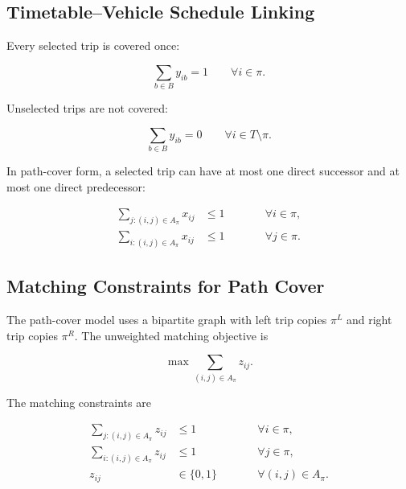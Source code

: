 \subsection{Timetable--Vehicle Schedule Linking}

Every selected trip is covered once:

\begin{equation}
\sum_{b\in B} y_{ib}=1
\qquad
\forall i\in \pi.
\label{eq:trip-covered-once}
\end{equation}

Unselected trips are not covered:

\begin{equation}
\sum_{b\in B} y_{ib}=0
\qquad
\forall i\in T\setminus \pi.
\label{eq:unselected-not-covered}
\end{equation}

In path-cover form, a selected trip can have at most one direct successor and
at most one direct predecessor:

\begin{align}
\sum_{j:(i,j)\in A_\pi} x_{ij} &\le 1
\qquad &&\forall i\in \pi, \label{eq:successor-limit}\\
\sum_{i:(i,j)\in A_\pi} x_{ij} &\le 1
\qquad &&\forall j\in \pi. \label{eq:predecessor-limit}
\end{align}

\subsection{Matching Constraints for Path Cover}

The path-cover model uses a bipartite graph with left trip copies \(\pi^L\)
and right trip copies \(\pi^R\). The unweighted matching objective is

\begin{equation}
\max
\sum_{(i,j)\in A_\pi} z_{ij}.
\label{eq:max-cardinality-matching}
\end{equation}

The matching constraints are

\begin{align}
\sum_{j:(i,j)\in A_\pi} z_{ij} &\le 1
\qquad &&\forall i\in \pi, \label{eq:matching-left}\\
\sum_{i:(i,j)\in A_\pi} z_{ij} &\le 1
\qquad &&\forall j\in \pi, \label{eq:matching-right}\\
z_{ij} &\in \{0,1\}
\qquad &&\forall (i,j)\in A_\pi. \label{eq:matching-binary}
\end{align}

